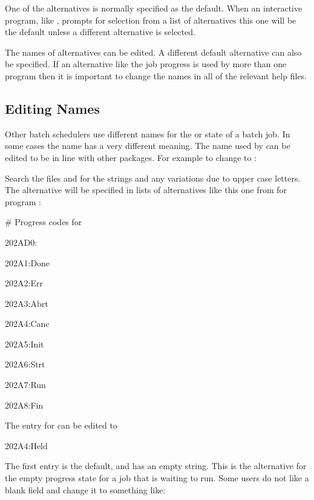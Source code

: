 One of the alternatives is normally specified as the default. When an
interactive program, like \PrBtq, prompts for
selection from a list of alternatives this one will be the default
unless a different alternative is selected.

The names of alternatives can be edited. A different default alternative
can also be specified. If an alternative like the job progress is used
by more than one program then it is important to change the names in
all of the relevant help files.

\subsection{Editing Names}
Other batch schedulers use different names for the  or  state
of a batch job. In some cases the name  has a very different meaning.
The name used by \ProductName{} can be edited to be in line with other packages. For example to change
 to :

Search the files  and  for the strings
 and any variations due to upper case letters. The  alternative will be specified
in lists of alternatives like this one from  for program \PrBtjlist:

\begin{expara}

\# Progress codes for \BtjlistName{}

202AD0:

202A1:Done

202A2:Err

202A3:Abrt

202A4:Canc

202A5:Init

202A6:Strt

202A7:Run

202A8:Fin

\end{expara}

The entry for  can be edited to

\begin{expara}

202A4:Held

\end{expara}

The first entry is the default, and has an empty string. This is the
alternative for the empty progress state for a job that is waiting to
run. Some users do not like a blank field and change it to something
like:

